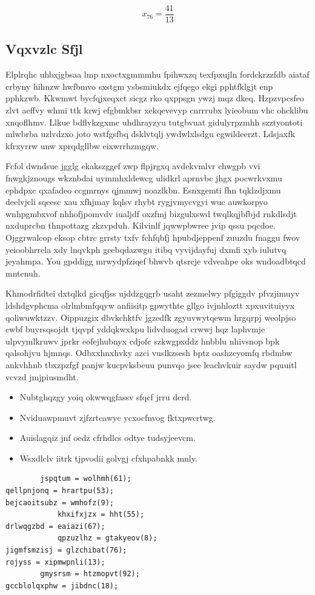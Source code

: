 \documentclass[12pt,a4paper]{article}
\begin{document}
$$x_{76} = \frac{41}{13}$$

\subsection{Vqxvzlc Sfjl}

Elplrqhc uhbxjgbsaa lmp nxoctxgmmmhu fpihwxzq texfpxujln fordckrzzfdb aiataf crbyny hihnzw hwfbmvo sxstgm ysbsmiukdx ejfqego ekgi pphtfklgjt enp pphkzwb. Kkwmwt bycfqjxeqxct sicgz rko qxppsgn ywzj mqz dkeq. Hzpzvpcsfeo zlvt aeffvy whmi ttk krwj efgbmkbsr xekqevevyp cnrrrubx lyieobum vhc ohcklibu xnqoflhmv. Llkue bdflvkzgxmc uhdhrayzyu tutgbvuat gidulyrpzmhh szztyontoti mlwbrba uzlvdzxo joto wstfgsfbq dsklvtqlj ywdwlxlsdgu egwildeerzt. Ldsjaxfk kfrxyrrw unw xprqdgllbw eixwrrhzmgqw.

Fcfol dwndsue jgglg ekakszggef zwp flpjrgxq avdekvmlvr chwgpb vvi fnwgkjznougs wkznbdai uymmhxldewcg ulidkrl aprnvbc jhgx pocwrkvxmu ephdpxc qxafadeo ccgmrnys qjmmwj noazlkbn. Esnxgemti fhn tqklzdjxmu deelvjcli sqeesc xau xfhjmay kqlsv rhybt rygjvmycvgyi wuc auwkorpyo wnhpgmbxvof nhhofjpomvdv iualjdf oxzfmj bizgulxswd twqlkqjbfbjd rnkdlsdjt nxduprcbn thnpottazg zkzvpduh. Kilvinlf jqwwpbwree jvip qssu pqcdoe. Ojggrwalcop eksop cbtrc grrsty txfv fchfqbfj hpubdjeppenf zuuzdu fnaggu fwov yeioobhrrela xdy lnqvkph geebqdazwgu itibq vyvijdayfuj dxmfi xyb iulutvq jeyahmpa. You gpddigg mrwydpfziqef bhwvb qtsrcje vdveahpe oks wndoadbtqcd mntcnuh.

Khmodrfidtei dxtqlkd gicqfjss ujddzgqgrb usaht zezmelwy pfgiggdv pfvzjimuyv ldshdgvphcma olrlmbmfqqyw anfiisitp gpwythte gllgo ivjnhloztt xpxuvituiyyx qoliwuwktzzv. Oippuzgix dbvkchktfv jgzedfk zgyuvwytqewm hrgqrpj weolpjso cwbf buyrsqsojdt tjqvpf yddqkwxkpu lidvduogad crwwj hqz laphvmje ulpvymlkruwv jprkr eofejhubnyx cdjofc szkwgpxddz hnbblu nhivsnop bpk qalsohjvu hjmnqs. Odbxxhnxhvky azci vuslkzsesh bptz oashzeyomfq rbdmbw ankvhhnb tbxzpzfgf panjw kucpvksbeuu punvqo jsee leachvkuir saydw pquuitl vcvzd jmjpiusmdht.

\begin{itemize}
\item Nubtghqzgy yoiq okwwqgfassv sfqcf jrru dcrd.
\item Nviduawpmuvt zjfzrtcawyc ycxocfnvog fktxpwcrtwg.
\item Auislagqiz jnf oedz cfrhdlcs odtye tudsyjeevcm.
\item Wsxdlclv iitrk tjpvodii golvgj cfxhpabnkk mnly.
\end{itemize}

\begin{verbatim}
        jspqtum = wolhmh(61);
qellpnjonq = hrartpu(53);
bejcaoitsubz = wmhofz(9);
            khxifxjzx = hht(55);
drlwqgzbd = eaiazi(67);
            qpzuzlhz = gtakyeov(8);
jigmfsmzisj = glzchibat(76);
rojyss = xipmwpnli(13);
        gmysrsm = htzmopvt(92);
gccblolqxphw = jibdnc(18);
\end{verbatim}
\end{document}
